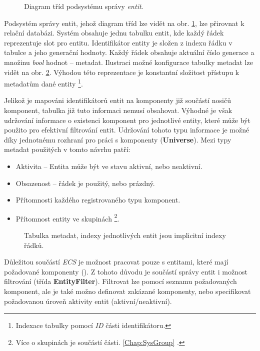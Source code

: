 \begin{figure}[H]
	\caption{Diagram tříd podsystému správy \emph{entit}.}
	\label{Fig:DESEntityDiagram}
\end{figure}

Podsystém správy entit, jehož diagram tříd lze vidět na obr. \ref{Fig:DESEntityDiagram}, lze přirovnat k relační databázi. Systém obsahuje jednu tabulku entit, kde každý řádek reprezentuje slot pro entitu. Identifikátor entity je složen z indexu řádku v tabulce a jeho generační hodnoty. Každý řádek obsahuje aktuální číslo generace a množinu \emph{bool} hodnot -- metadat. Ilustraci možné konfigurace tabulky metadat lze vidět na obr. \ref{Fig:DESMetadata}. Výhodou této reprezentace je konstantní složitost přístupu k metadatům dané entity \footnote{Indexace tabulky pomocí \emph{ID} části identifikátoru.}. 

Jelikož je mapováni identifikátorů entit na komponenty již součástí nosičů komponent, tabulka již tuto informaci nemusí obsahovat. Výhodné je však udržování informace o existenci komponent pro jednotlivé entity, které může být použito pro efektivní filtrování entit. Udržování tohoto typu informace je možné díky jednotnému rozhraní pro práci s komponenty (\textbf{Universe}). Mezi typy metadat použitých v tomto návrhu patří: 
\begin{itemize}
	\item Aktivita -- Entita může být ve stavu aktivní, nebo neaktivní.
	\item Obsazenost -- řádek je použitý, nebo prázdný. 
	\item Přítomnosti každého registrovaného typu komponent.
	\item Přítomnost entity ve skupinách \footnote{Více o skupinách je součástí části. \ref{Chap:SysGroup} .}.
\end{itemize}

\begin{figure}
	\caption{Tabulka metadat, indexy jednotlivých entit jsou implicitní indexy řádků.}
	\label{Fig:DESMetadata}
\end{figure}

Důležitou součástí \emph{ECS} je možnost pracovat pouze s entitami, které mají požadované komponenty (). Z tohoto důvodu je součástí správy entit i možnost filtrování (třída \textbf{EntityFilter}). Filtrovat lze pomocí seznamu požadovaných komponent, ale je také možno definovat zakázané komponenty, nebo specifikovat požadovanou úroveň aktivity entit (aktivní/neaktivní).

